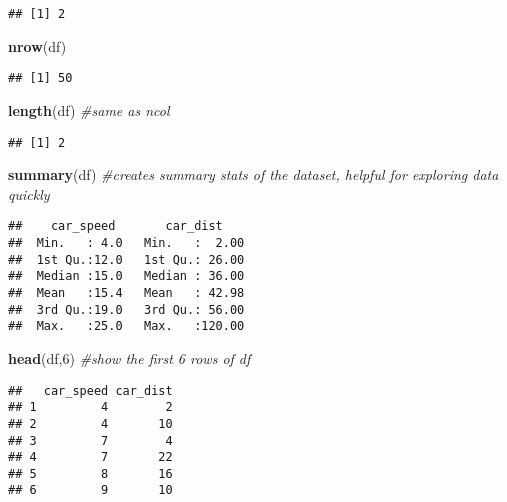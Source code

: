 \documentclass[
]{article}
\newenvironment{Shaded}{\begin{snugshade}}{\end{snugshade}}
\newcommand{\CommentTok}[1]{\textcolor[rgb]{0.56,0.35,0.01}{\textit{#1}}}
\newcommand{\DecValTok}[1]{\textcolor[rgb]{0.00,0.00,0.81}{#1}}
\newcommand{\FunctionTok}[1]{\textcolor[rgb]{0.13,0.29,0.53}{\textbf{#1}}}
\newcommand{\NormalTok}[1]{#1}
\begin{document}
\begin{verbatim}
## [1] 2
\end{verbatim}

\begin{Shaded}
\begin{Highlighting}[]
\FunctionTok{nrow}\NormalTok{(df)  }
\end{Highlighting}
\end{Shaded}

\begin{verbatim}
## [1] 50
\end{verbatim}

\begin{Shaded}
\begin{Highlighting}[]
\FunctionTok{length}\NormalTok{(df)  }\CommentTok{\#same as ncol}
\end{Highlighting}
\end{Shaded}

\begin{verbatim}
## [1] 2
\end{verbatim}

\begin{Shaded}
\begin{Highlighting}[]
\FunctionTok{summary}\NormalTok{(df) }\CommentTok{\#creates summary stats of the dataset, helpful for exploring data quickly}
\end{Highlighting}
\end{Shaded}

\begin{verbatim}
##    car_speed       car_dist     
##  Min.   : 4.0   Min.   :  2.00  
##  1st Qu.:12.0   1st Qu.: 26.00  
##  Median :15.0   Median : 36.00  
##  Mean   :15.4   Mean   : 42.98  
##  3rd Qu.:19.0   3rd Qu.: 56.00  
##  Max.   :25.0   Max.   :120.00
\end{verbatim}

\begin{Shaded}
\begin{Highlighting}[]
\FunctionTok{head}\NormalTok{(df,}\DecValTok{6}\NormalTok{) }\CommentTok{\#show the first 6 rows of df}
\end{Highlighting}
\end{Shaded}

\begin{verbatim}
##   car_speed car_dist
## 1         4        2
## 2         4       10
## 3         7        4
## 4         7       22
## 5         8       16
## 6         9       10
\end{verbatim}
\end{document}
